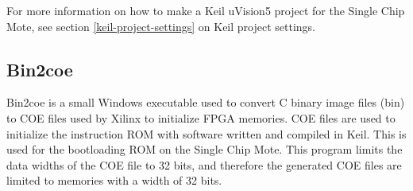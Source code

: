 For more information on how to make a Keil uVision5 project for the Single Chip Mote, see section \ref{keil-project-settings} on Keil project settings.

\subsection{Bin2coe} \label{bin2coe}
Bin2coe \cite{bin2coe-download} is a small Windows executable used to convert C binary image files (bin) to COE files used by Xilinx to initialize FPGA memories. COE files are used to initialize the instruction ROM with software written and compiled in Keil. This is used for the bootloading ROM on the Single Chip Mote. This program limits the data widths of the COE file to 32 bits, and therefore the generated COE files are limited to memories with a width of 32 bits.
